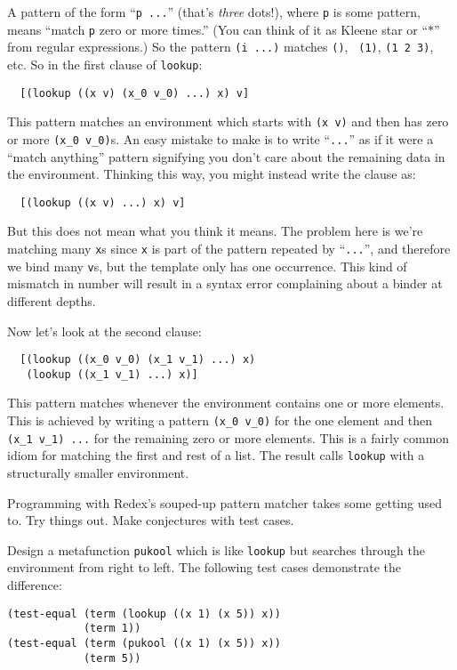A pattern of the form ``{\tt p ...}'' (that's \emph{three} dots!),
where {\tt p} is some pattern, means ``match {\tt p} zero or more
times.''  (You can think of it as Kleene star or ``$*$'' from regular
expressions.)  So the pattern {\tt (i ...)} matches {\tt ()}, {\tt
  (1)}, {\tt (1 2 3)}, etc.  So in the first clause of {\tt lookup}:
\begin{verbatim}
  [(lookup ((x v) (x_0 v_0) ...) x) v]
\end{verbatim}
This pattern matches an environment which starts with {\tt (x v)} and
then has zero or more {\tt (x\_0 v\_0)}s.  An easy mistake to make is to
write ``{\tt ...}'' as if it were a ``match anything'' pattern
signifying you don't care about the remaining data in the environment.
Thinking this way, you might instead write the clause as:
\begin{verbatim}
  [(lookup ((x v) ...) x) v]
\end{verbatim}
But this does not mean what you think it means.  The problem here is
we're matching many {\tt x}s since {\tt x} is part of the pattern
repeated by ``{\tt ...}'', and therefore we bind many {\tt v}s, but
the template only has one occurrence.  This kind of mismatch in number
will result in a syntax error complaining about a binder at different
depths.

Now let's look at the second clause:
\begin{verbatim}
  [(lookup ((x_0 v_0) (x_1 v_1) ...) x)
   (lookup ((x_1 v_1) ...) x)]
\end{verbatim}
This pattern matches whenever the environment contains one or more
elements.  This is achieved by writing a pattern {\tt (x\_0 v\_0)} for
the one element and then {\tt (x\_1 v\_1) ...} for the remaining zero
or more elements.  This is a fairly common idiom for matching the
first and rest of a list.  The result calls {\tt lookup} with a
structurally smaller environment.


Programming with Redex's souped-up pattern matcher takes some getting
used to.  Try things out.  Make conjectures with test cases.

\begin{exercise}
Design a metafunction {\tt pukool} which is like {\tt lookup} but
searches through the environment from right to left.  The following
test cases demonstrate the difference:
\begin{verbatim}
(test-equal (term (lookup ((x 1) (x 5)) x))
            (term 1))
(test-equal (term (pukool ((x 1) (x 5)) x))
            (term 5))
\end{verbatim}
\end{exercise}


